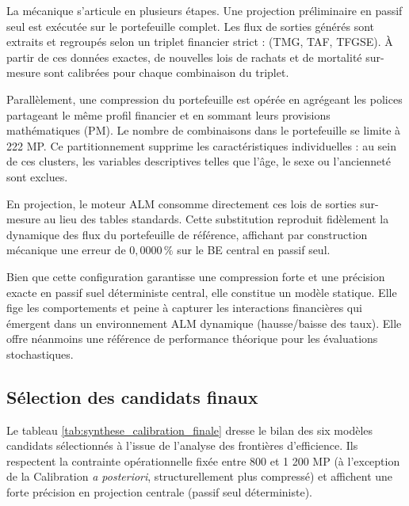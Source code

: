 La mécanique s'articule en plusieurs étapes. Une projection préliminaire en passif seul est exécutée sur le portefeuille complet. Les flux de sorties générés sont extraits et regroupés selon un triplet financier strict : (TMG, TAF, TFGSE). À partir de ces données exactes, de nouvelles lois de rachats et de mortalité sur-mesure sont calibrées pour chaque combinaison du triplet. 

Parallèlement, une compression du portefeuille est opérée en agrégeant les polices partageant le même profil financier et en sommant leurs provisions mathématiques (PM). Le nombre de combinaisons dans le portefeuille se limite à 222 MP. Ce partitionnement supprime les caractéristiques individuelles : au sein de ces clusters, les variables descriptives telles que l'âge, le sexe ou l'ancienneté sont exclues.

En projection, le moteur ALM consomme directement ces lois de sorties sur-mesure au lieu des tables standards. Cette substitution reproduit fidèlement la dynamique des flux du portefeuille de référence, affichant par construction mécanique une erreur de $0{,}0000\,\%$ sur le BE central en passif seul.

Bien que cette configuration garantisse une compression forte et une précision exacte en passif suel déterministe central, elle constitue un modèle statique. Elle fige les comportements et peine à capturer les interactions financières qui émergent dans un environnement ALM dynamique (hausse/baisse des taux). Elle offre néanmoins une référence de performance théorique pour les évaluations stochastiques.

\subsection{Sélection des candidats finaux}

Le tableau \ref{tab:synthese_calibration_finale} dresse le bilan des six modèles candidats sélectionnés à l'issue de l'analyse des frontières d'efficience. Ils respectent la contrainte opérationnelle fixée entre 800 et 1 200 MP (à l'exception de la Calibration \textit{a posteriori}, structurellement plus compressé) et affichent une forte précision en projection centrale (passif seul déterministe).

